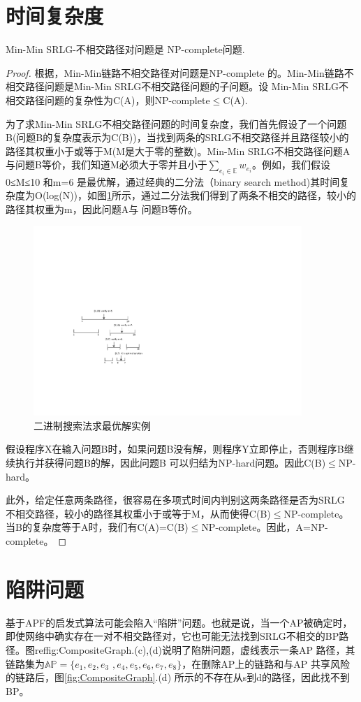 \section{时间复杂度}
\begin{theorem}
\label{le:lemma1}
    Min-Min SRLG-不相交路径对问题是 NP-complete问题.
\end{theorem}
\begin{proof}
根据\cite{bhatia2006finding}，Min-Min链路不相交路径对问题是NP-complete 的。Min-Min链路不相交路径问题是Min-Min SRLG不相交路径问题的子问题。设
Min-Min SRLG不相交路径问题的复杂性为C(A)，则NP-complete$\leq$C(A).

为了求Min-Min SRLG不相交路径问题的时间复杂度，我们首先假设了一个问题B(问题B的复杂度表示为C(B))，当找到两条的SRLG不相交路径并且路径较小的路径其权重小于或等于M(M是大于零的整数)。Min-Min SRLG不相交路径问题A 与问题B等价，我们知道M必须大于零并且小于$\sum\limits_{e_i\in \mathbb{E}}w_{e_i}$。例如，我们假设0≤M≤10 和m=6 是最优解，通过经典的二分法（binary search method)其时间复杂度为O(log(N))，如图\ref{fig:binarySearch}所示，通过二分法我们得到了两条不相交的路径，较小的路径其权重为m，因此问题A与 问题B等价。
\begin{figure}[htbp]
  \centering
  \includegraphics[width=4.0in]{figures/binarySearch}
  \caption{二进制搜索法求最优解实例}
  \label{fig:binarySearch}
\end{figure}
假设程序X在输入问题B时，如果问题B没有解，则程序Y立即停止，否则程序B继续执行并获得问题B的解，因此问题B 可以归结为NP-hard问题。因此C(B)$\leq$NP-hard。

此外，给定任意两条路径，很容易在多项式时间内判别这两条路径是否为SRLG 不相交路径，较小的路径其权重小于或等于M，从而使得C(B)$\leq$NP-complete。 当B的复杂度等于A时，我们有C(A)=C(B)$\leq$NP-complete。因此，A=NP-complete。
\end{proof}
\section{陷阱问题}
\label{sec:trapproblem}
基于APF的启发式算法可能会陷入“陷阱”问题。也就是说，当一个AP被确定时，即使网络中确实存在一对不相交路径对，它也可能无法找到SRLG不相交的BP路径。图ref{fig:CompositeGraph}.(c),(d)说明了陷阱问题，虚线表示一条AP 路径，其链路集为$\mathbb{AP}=\{e_1,e_2,e_3$ $,e_4,e_5,e_6,e_7,e_8\}$，在删除AP上的链路和与AP 共享风险的链路后，图\ref{fig:CompositeGraph}.(d) 所示的不存在从s到d的路径，因此找不到BP。

